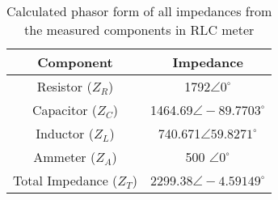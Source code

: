 \documentclass[12pt]{report}
\begin{document}
\begin{table}[ht]
\centering
\begin{tabular}{|c|c|}
\hline
\rowcolor{lightblue} \textbf{Component} & \textbf{Impedance} \\
\hline
Resistor ($Z_R$) & 1792$\angle0^\circ$ \\
\hline
Capacitor ($Z_C$) & 1464.69$\angle-89.7703^\circ$\\
\hline
Inductor ($Z_L$) & 740.671$\angle59.8271^\circ$\\
\hline
Ammeter ($Z_A$) & 500 $\angle0^\circ$ \\
\hline
Total Impedance ($Z_T$) & 2299.38$\angle-4.59149^\circ$ \\
\hline
\end{tabular}
\caption{Calculated phasor form of all impedances from the measured components in RLC meter}
\end{table}
\end{document}
